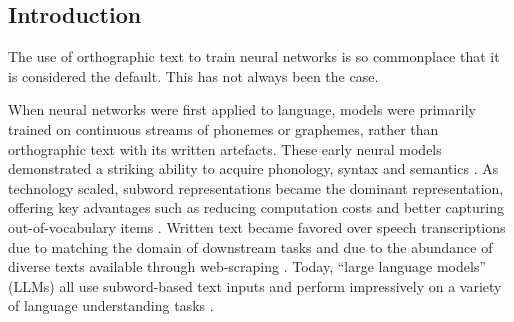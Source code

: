 
\subsection{Introduction}


The use of orthographic text to train neural networks is so commonplace that it is considered the default. This has not always been the case.

When neural networks were first applied to language, models were primarily trained on continuous streams of phonemes or graphemes, rather than orthographic text with its written artefacts. These early neural models demonstrated a striking ability to acquire phonology, syntax and semantics \citep{elman-1990-finding, seidenberg-1989-word-recognition, prince-1997-optimality}. As technology scaled, subword representations became the dominant representation, offering key advantages such as reducing computation costs and better capturing out-of-vocabulary items \citep{sennrich-etal-2016-bpe}. Written text became favored over speech transcriptions due to matching the domain of downstream tasks and due to the abundance of diverse texts available through web-scraping \citep{bansal-2022-datascaling}. Today, ``large language models'' (LLMs) all use subword-based text inputs and perform impressively on a variety of language understanding tasks \citep{zellers-etal-2019-hellaswag, hendrycks-2020-mmlu, suzgun-2023-Big-Bench}.

